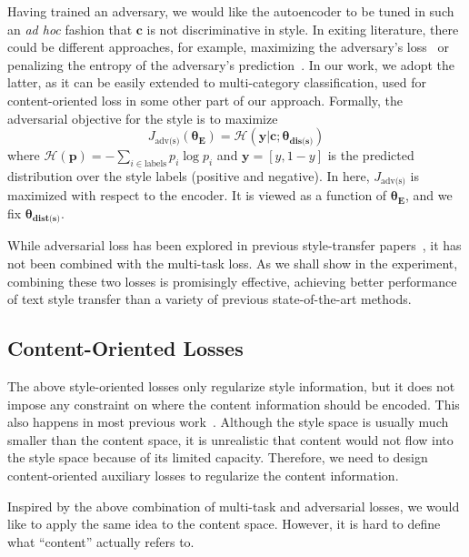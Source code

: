 \documentclass[letterpaper]{article} %
\newcommand{\loss}[1]{J_{\text{#1}}}
\newcommand{\nnweight}[1]{\bm{\theta_{\text{#1}}}}
\begin{document}
Having trained an adversary, we would like the autoencoder to be tuned in such an \textit{ad hoc} fashion that $\bm c$ is not discriminative in style. In exiting literature, there could be different approaches, for example, maximizing the adversary's loss~\cite{shen2017style,zhao2018adversarially} or penalizing the entropy  of the adversary's prediction~\cite{fu2017style}. In our work, we adopt the latter, as it can be easily extended to multi-category classification, used for content-oriented loss in some other part of our approach. Formally, the adversarial objective for the style is to maximize
\begin{equation}
	\loss{adv(s)}(\nnweight{E})=\mathcal{H}(\bm y|\bm c; \nnweight{dis(s)})\label{eqn:advs}
\end{equation}
where $\mathcal{H}(\bm p)=-\sum_{i\in\text{labels}}p_i\log p_i$ and $\bm y=[y, 1-y]$ is the predicted distribution over the style labels (positive and negative). In here, $\loss{adv(s)}$ is maximized with respect to the encoder. It is viewed as a function of $\nnweight{E}$, and we fix $\nnweight{dist(s)}$.

While adversarial loss has been explored in previous style-transfer papers~\cite{shen2017style,fu2017style,zhao2018adversarially}, it has not been combined with the multi-task loss. As we shall show in the experiment, combining these two losses is promisingly effective, achieving better performance of text style transfer than a variety of previous state-of-the-art methods.

\subsection{Content-Oriented Losses}

The above style-oriented losses only regularize style information, but it does not impose any constraint on where the content information should be encoded. This also happens in most previous work~\cite{hu2017toward,shen2017style,fu2017style,zhao2018adversarially}.
Although the style space is usually much smaller than the content space, it is unrealistic that content would not flow into the style space because of its limited capacity. Therefore, we need to design content-oriented auxiliary losses to regularize the content information.

Inspired by the above combination of multi-task and adversarial losses, we would like to apply the same idea to the content space. However, it is hard to define what ``content'' actually refers to.
\end{document}
